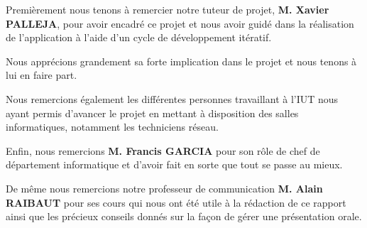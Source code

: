 


Premièrement nous tenons à remercier notre tuteur de projet, \textbf{M. Xavier PALLEJA}, pour avoir encadré ce projet et nous avoir guidé dans la réalisation de l'application à l'aide d'un cycle de développement itératif.

Nous apprécions grandement sa forte implication dans le projet et nous tenons à lui en faire part.

\bigbreak

Nous remercions également les différentes personnes travaillant à l'IUT nous ayant permis d'avancer le projet en mettant à disposition des salles informatiques, notamment les techniciens réseau.

\bigbreak
Enfin, nous remercions \textbf{M. Francis GARCIA} pour son rôle de chef de département informatique et d'avoir fait en sorte que tout se passe au mieux.

De même nous remercions notre professeur de communication \textbf{M. Alain RAIBAUT} pour ses cours qui nous ont été utile à la rédaction de ce rapport ainsi que les précieux conseils donnés sur la façon de gérer une présentation orale.
